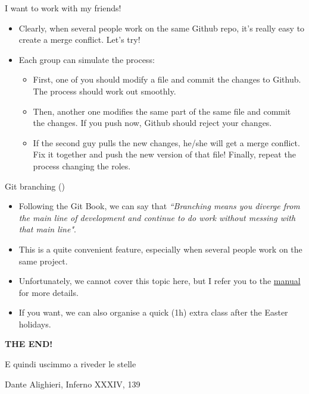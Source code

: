 \documentclass[
hyperref={bookmarks=false},
xcolor={dvipsnames,svgnames*,x11names*}, 
12pt
]{beamer}
\begin{document}
\begin{frame}[fragile]{I want to work with my friends!}
\vspace{-0.5cm}
\begin{itemize}
\itemsep 2ex
\item Clearly, when several people work on the same Github repo, it's really easy to create a merge conflict. Let's try! 
\item Each group can simulate the process: 
\begin{itemize}
\item First, one of you should modify a file and commit the changes to Github. The process should work out smoothly. 
\item Then, another one modifies the same part of the same file and commit the changes. If you push now, Github should reject your changes. 
\item If the second guy pulls the new changes, he/she will get a merge conflict. Fix it together and push the new version of that file! Finally, repeat the process changing the roles. 
\end{itemize}
\end{itemize}
\end{frame}

\begin{frame}{Git branching ()}
\vspace{-0.5cm}
\begin{itemize}
\itemsep 2ex
\item Following the Git Book, we can say that \emph{``Branching means you diverge from the main line of development and continue to do work without messing with that main line"}.
\item This is a quite convenient feature, especially when several people work on the same project.
\item Unfortunately, we cannot cover this topic here, but I refer you to the \href{https://git-scm.com/book/en/v2/Git-Branching-Branches-in-a-Nutshell}{manual} for more details. 
\item If you want, we can also organise a quick (1h) extra class after the Easter holidays. 
\end{itemize}
\end{frame}

\begin{frame}
\vspace{2cm}
\begin{center}
\Huge
\textbf{THE END!}
\end{center}
\vspace{1.5cm}
\epigraph{E quindi uscimmo a riveder le stelle}{Dante Alighieri, Inferno XXXIV, 139}
\end{frame}
\end{document}
